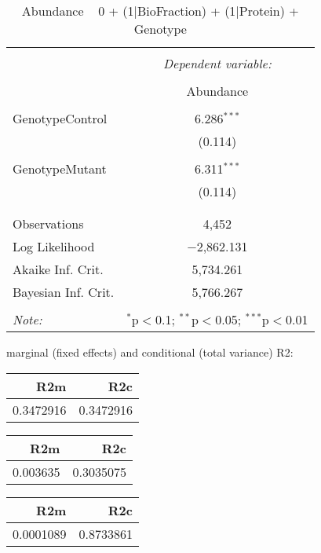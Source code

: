 \documentclass[11pt]{report}
\begin{document}
\begin{table}[!htbp] \centering 
  \caption{Abundance ~ 0 + (1|BioFraction) + (1|Protein) + Genotype} 
  \label{} 
\begin{tabular}{@{\extracolsep{5pt}}lc} 
\\[-1.8ex]\hline 
\hline \\[-1.8ex] 
 & \multicolumn{1}{c}{\textit{Dependent variable:}} \\ 
\cline{2-2} 
\\[-1.8ex] & Abundance \\ 
\hline \\[-1.8ex] 
 GenotypeControl & 6.286$^{***}$ \\ 
  & (0.114) \\ 
  & \\ 
 GenotypeMutant & 6.311$^{***}$ \\ 
  & (0.114) \\ 
  & \\ 
\hline \\[-1.8ex] 
Observations & 4,452 \\ 
Log Likelihood & $-$2,862.131 \\ 
Akaike Inf. Crit. & 5,734.261 \\ 
Bayesian Inf. Crit. & 5,766.267 \\ 
\hline 
\hline \\[-1.8ex] 
\textit{Note:}  & \multicolumn{1}{r}{$^{*}$p$<$0.1; $^{**}$p$<$0.05; $^{***}$p$<$0.01} \\ 
\end{tabular} 
\end{table} 
marginal (fixed effects) and conditional (total variance) R2:

\begin{tabular}{r|r}
\hline
R2m & R2c\\
\hline
0.3472916 & 0.3472916\\
\hline
\end{tabular}

\begin{tabular}{r|r}
\hline
R2m & R2c\\
\hline
0.003635 & 0.3035075\\
\hline
\end{tabular}

\begin{tabular}{r|r}
\hline
R2m & R2c\\
\hline
0.0001089 & 0.8733861\\
\hline
\end{tabular}
\end{document}
